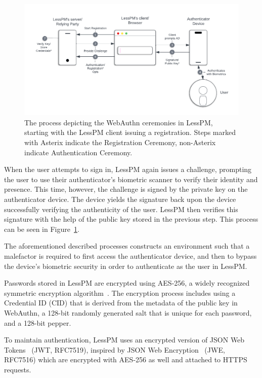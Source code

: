 \begin{figure}[htbp]
  \begin{center}
    \includegraphics[scale=0.49]{images/webauthn}
    \caption{The process depicting the WebAuthn ceremonies in LessPM,
      starting with the LessPM client issuing a registration. Steps marked
      with Asterix indicate the Registration Ceremony, non-Asterix indicate
      Authentication Ceremony. }
    \label{fig:webauthn}
  \end{center}
\end{figure}

When the user attempts to sign in, LessPM again issues a challenge,
prompting the user to use their authenticator's biometric scanner to verify
their identity and presence.
This time, however, the challenge is signed by the private key on the
authenticator device.
The device yields the signature back upon the device successfully verifying the
authenticity of the user.
LessPM then verifies this signature with the help of the public key
stored in the previous step.
This process can be seen in Figure~\ref{fig:webauthn}.

The aforementioned described processes constructs an environment such that a
malefactor is required to first access the authenticator device, and then
to bypass the device's biometric security in order to authenticate as the user
in LessPM\@.

Passwords stored in LessPM are encrypted using AES-256, a widely recognized
symmetric encryption algorithm~\cite{schneier2000secrets,rijndael_book}.
The encryption process includes using a Credential ID (CID) that is derived from
the metadata of the public key in WebAuthn, a 128-bit randomly generated salt
that is unique for each password, and a 128-bit pepper.

To maintain authentication, LessPM uses an encrypted version of JSON Web
Tokens~\cite{RFC7519} (JWT, RFC7519), inspired by JSON Web
Encryption~\cite{rfc7516} (JWE, RFC7516) which are encrypted with AES-256 as
well and attached to HTTPS requests.

